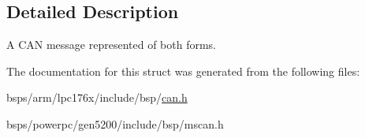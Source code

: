 \subsection{Detailed Description}
A C\+AN message represented of both forms. 

The documentation for this struct was generated from the following files\+:\begin{DoxyCompactItemize}
\item 
bsps/arm/lpc176x/include/bsp/\mbox{\hyperlink{can_8h}{can.\+h}}\item 
bsps/powerpc/gen5200/include/bsp/mscan.\+h\end{DoxyCompactItemize}
